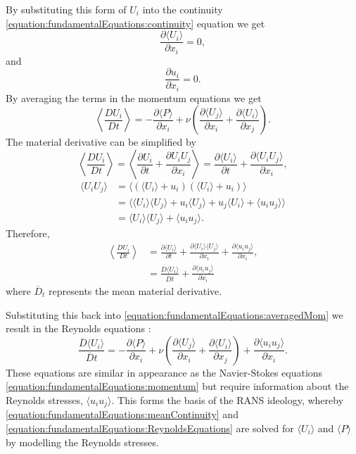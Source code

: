 \documentclass[12pt,oneside,a4paper]{article}
\newcommand{\pdev}[2]{\frac{\partial {#1}}{\partial {#2}}}
\newcommand{\Ddev}[2]{\frac{D {#1}}{D {#2}}}
\begin{document}
By substituting this form of $U_i$ into the continuity \eqref{equation:fundamentalEquations:continuity} equation we get
\begin{equation}
\pdev{\langle U_i\rangle}{x_i}=0,
\label{equation:fundamentalEquations:meanContinuity}
\end{equation}
and
\begin{equation}
\pdev{u_i}{x_i}=0.
\label{equation:fundamentalEquations:flucContinuity}
\end{equation}
By averaging the terms in the momentum equations we get
\begin{equation}
\left\langle \Ddev{U_i}{t} \right\rangle
=
-\pdev{\langle P \rangle}{x_i}
+
\nu
	\left(
	\pdev{\langle U_j \rangle}{x_i}
	+
	\pdev{\langle U_i \rangle}{x_j} 
	\right).
\label{equation:fundamentalEquations:averagedMom}
\end{equation}
The material derivative can be simplified by
\begin{equation}
\left\langle \Ddev{U_i}{t} \right\rangle
=
\left\langle
	\pdev{U_i}{t} + \pdev{U_i U_j}{x_i}
\right\rangle
=
\pdev{\langle U_i\rangle}{t}
+
\pdev{\langle U_i U_j\rangle}{x_i},
\end{equation}
\begin{align}
\langle U_i U_j\rangle 
&=
\langle
	(\langle U_i \rangle + u_i)(\langle U_i \rangle + u_i)
\rangle \\
&=
\langle
	\langle U_i \rangle \langle U_j \rangle
	+
	u_i \langle U_j \rangle
	+
	u_j \langle U_i \rangle
	+
	\langle u_i u_j \rangle
\rangle\\
&=
\langle U_i \rangle \langle U_j \rangle
+
\langle u_i u_j \rangle.
\end{align}
Therefore,
\begin{align}
\left\langle \Ddev{U_i}{t} \right\rangle
&=
\pdev{\langle U_i\rangle}{t} 
+
\pdev{\langle U_i\rangle \langle U_j\rangle}{x_i}
+
\pdev{\langle u_i u_j\rangle}{x_i},\\
&=
\frac{\overline{D} \langle U_i \rangle }{ \overline{D} t}
+ 
\pdev{\langle u_i u_j\rangle}{x_i}
\end{align}
where $\overline{D}_t$ represents the mean material derivative. 

Substituting this back into \eqref{equation:fundamentalEquations:averagedMom} we result in the Reynolds equations \citep{pope2001}:
\begin{equation}
\frac{\overline{D} \langle U_i \rangle }{ \overline{D} t}
=
-\pdev{\langle P \rangle}{x_i}
+
\nu
	\left(
	\pdev{\langle U_j \rangle}{x_i}
	+
	\pdev{\langle U_i \rangle}{x_j} 
	\right)
+
\pdev{\langle u_i u_j\rangle}{x_i}.
\label{equation:fundamentalEquations:ReynoldsEquations}
\end{equation}
These equations are similar in appearance as the Navier-Stokes equations \eqref{equation:fundamentalEquations:momentum} but require information about the Reynolds stresses, $\langle u_i u_j \rangle$. This forms the basis of the RANS ideology, whereby \eqref{equation:fundamentalEquations:meanContinuity} and \eqref{equation:fundamentalEquations:ReynoldsEquations} are solved for $\langle U_i \rangle$ and $\langle P \rangle$ by modelling the Reynolds stresses.
\end{document}
